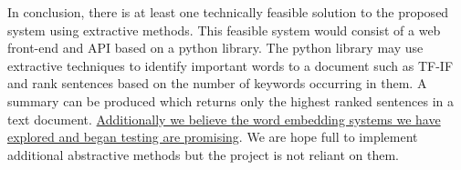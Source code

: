 \documentclass[12pt]{article}
\begin{document}
In conclusion, there is at least one technically feasible solution to the proposed system using extractive methods. This feasible system would consist of a web front-end and API based on a python library. The python library may use extractive techniques to identify important words to a document such as TF-IF and rank sentences based on the number of keywords occurring in them. A summary can be produced which returns only the highest ranked sentences in a text document. \href{https://github.com/browlm13/Word-Embedding/blob/master/word_embedding_mock_1_v3.pdf}{Additionally we believe the word embedding systems we have explored and began testing are promising}. We are hope full to implement additional abstractive methods but the project is not reliant on them. 



\end{document}

